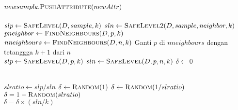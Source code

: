 \begin{center}
\begin{algorithmic}[1]
		\State $ newsample.\Call{PushAttribute}{newAttr} $
	\EndFor
	\\
	\State {}
\EndFunction
\\
	\State $ slp \gets \Call{SafeLevel}{D, sample, k} $
	\State $ sln \gets \Call{SafeLevel2}{D, sample, neighbor, k} $
	\State {}
\EndFunction
\\
	\State $ pneighbor \gets \Call{FindNeighbours}{ D, p, k } $
	\State {}
\EndFunction
\\
	\State $ nneighbours \gets \Call{FindNeighbours}{ D, n, k } $
		\State Ganti $ p $ di $ nneighbours $ dengan tetanggga $ k + 1 $
		dari $ n $
	\EndIf
	\State {}
\EndFunction
\\
	\State $ slp \gets \Call{SafeLevel}{D, p, k} $
	\State $ sln \gets \Call{SafeLevel}{D, p, n, k} $
	\State $ \delta \gets 0 $

		\State \Return{$ \delta $}
	\EndIf
	\\
	\State $ slratio \gets slp / sln $
		\State $ \delta \gets \Call{Random}{1} $
		\State $ \delta \gets \Call{Random}{1 / slratio} $
	\Else
		\State $ \delta = 1 - \Call{Random}{slratio} $
	\EndIf
	\\
		\State $ \delta = \delta \times (sln / k) $
	\EndIf
	\\
	\State \Return{$ \delta $}
\EndFunction
	\end{algorithmic}
\end{center}
